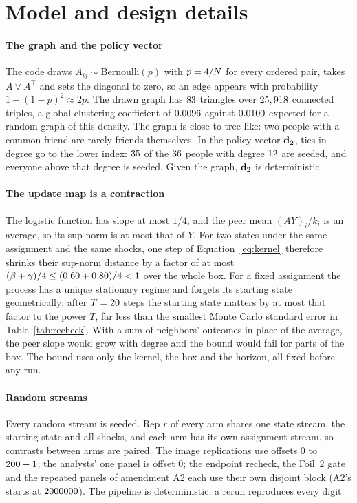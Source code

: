 \section{Model and design details}\label{app:model}

\paragraph{The graph and the policy vector} The code draws
$A_{ij}\sim\mathrm{Bernoulli}(p)$ with $p=4/N$ for every ordered pair,
takes $A\lor A^\top$ and sets the diagonal to zero, so an edge appears with
probability $1-(1-p)^2\approx 2p$. The drawn graph has $83$ triangles over
$25,918$ connected triples, a global clustering coefficient of
$0.0096$ against $0.0100$ expected for a random graph
of this density. The graph is close to tree-like: two people with a common friend
are rarely friends themselves. In the policy vector $\mathbf{d}_2$, ties in degree go to the lower
index: $35$ of the $36$ people with degree
$12$ are seeded, and everyone above that degree is seeded. Given the graph,
$\mathbf{d}_2$ is deterministic.

\paragraph{The update map is a contraction} The logistic function has slope at
most $1/4$, and the peer mean $(AY)_i/k_i$ is an average, so its sup norm is at
most that of $Y$. For two states under the same assignment and the same shocks,
one step of Equation~\eqref{eq:kernel} therefore shrinks their sup-norm distance by
a factor of at most $(\beta+\gamma)/4\le(0.60+0.80)/4<1$ over the
whole box. For a fixed assignment the process has a unique stationary regime and
forgets its starting state geometrically; after $T=20$ steps the starting
state matters by at most that factor to the power $T$, far less than the smallest
Monte Carlo standard error in Table~\ref{tab:recheck}. With a sum of neighbors'
outcomes in place of the average, the peer slope would grow with degree and the
bound would fail for parts of the box. The bound uses only the kernel, the box and
the horizon, all fixed before any run.

\paragraph{Random streams} Every random stream is seeded. Rep $r$ of every arm
shares one state stream, the starting state and all shocks, and each arm has its
own assignment stream, so contrasts between arms are paired. The image
replications use offsets $0$ to $200-1$; the analysts' one panel is
offset $0$; the endpoint recheck, the Foil~2 gate and the repeated panels of
amendment A2 each use their own disjoint block (A2's starts at
$2000000$). The pipeline is deterministic: a rerun reproduces every
digit.

